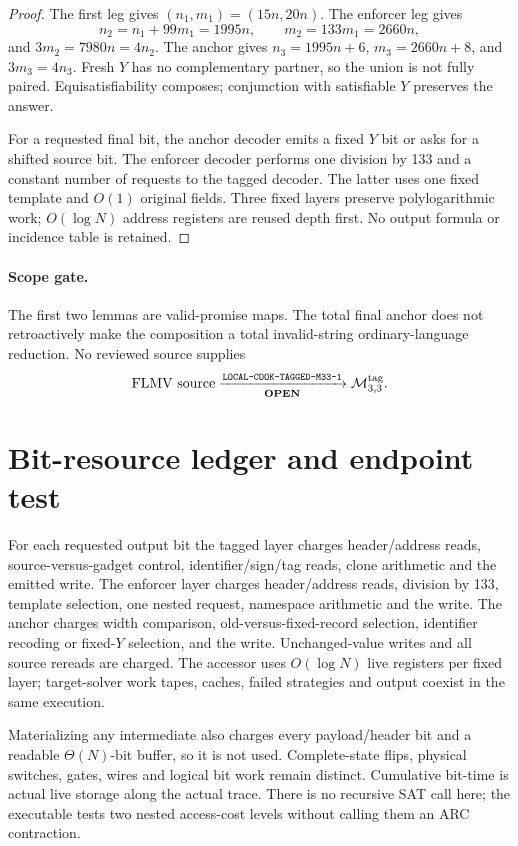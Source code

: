\documentclass[11pt]{article}
\newcommand{\OPEN}{\textbf{OPEN}}
\begin{document}
\begin{proof}
The first leg gives $(n_1,m_1)=(15n,20n)$.  The enforcer leg gives
\[
n_2=n_1+99m_1=1995n,\qquad m_2=133m_1=2660n,
\]
and $3m_2=7980n=4n_2$.  The anchor gives
$n_3=1995n+6$, $m_3=2660n+8$, and $3m_3=4n_3$.
Fresh $Y$ has no complementary partner, so the union is not fully paired.
Equisatisfiability composes; conjunction with satisfiable $Y$ preserves the
answer.

For a requested final bit, the anchor decoder emits a fixed $Y$ bit or asks
for a shifted source bit.  The enforcer decoder performs one division by
133 and a constant number of requests to the tagged decoder.  The latter
uses one fixed template and $O(1)$ original fields.  Three fixed layers
preserve polylogarithmic work; $O(\log N)$ address registers are reused depth
first.  No output formula or incidence table is retained.
\end{proof}

\paragraph{Scope gate.}
The first two lemmas are valid-promise maps.  The total final anchor does not
retroactively make the composition a total invalid-string ordinary-language
reduction.  No reviewed source supplies
\[
\text{FLMV source}\xrightarrow[\OPEN]
{\texttt{LOCAL-COOK-TAGGED-M33-1}}\mathcal M_{3,3}^{\rm tag}.
\]

\section{Bit-resource ledger and endpoint test}

For each requested output bit the tagged layer charges header/address reads,
source-versus-gadget control, identifier/sign/tag reads, clone arithmetic and
the emitted write.  The enforcer layer charges header/address reads, division
by 133, template selection, one nested request, namespace arithmetic and the
write.  The anchor charges width comparison, old-versus-fixed-record
selection, identifier recoding or fixed-$Y$ selection, and the write.
Unchanged-value writes and all source rereads are charged.  The accessor uses
$O(\log N)$ live registers per fixed layer; target-solver work tapes, caches,
failed strategies and output coexist in the same execution.

Materializing any intermediate also charges every payload/header bit and a
readable $\Theta(N)$-bit buffer, so it is not used.  Complete-state flips,
physical switches, gates, wires and logical bit work remain distinct.
Cumulative bit-time is actual live storage along the actual trace.  There is
no recursive SAT call here; the executable tests two nested access-cost
levels without calling them an ARC contraction.
\end{document}
